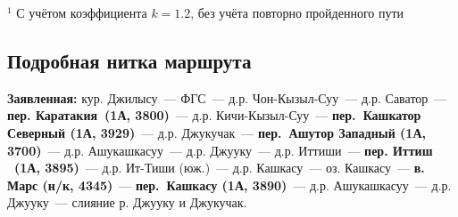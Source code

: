 \begin{table}[h!]
\end{table}
\footnotesize{$^1$ С учётом коэффициента $k=1.2$, без учёта повторно пройденного пути}
\normalsize

\subsection{Подробная нитка маршрута}
\textbf{Заявленная:} кур. Джилысу~--- ФГС~--- д.р. Чон-Кызыл-Суу~--- д.р. Саватор~---  \textbf{пер. Каратакия~(1А, 3800)}~--- д.р. Кичи-Кызыл-Суу~---  \textbf{пер.~Кашкатор Северный (1А, 3929)}~--- д.р. Джукучак~--- \textbf{пер.~Ашутор Западный (1А, 3700)}~--- д.р. Ашукашкасуу~---  д.р. Джууку~---  д.р. Иттиши~---  \textbf{пер. Иттиш ~(1А, 3895)}~---  д.р. Ит-Тиши (юж.)~---   д.р. Кашкасу~---   оз. Кашкасу~---  \textbf{в. Марс (н/к, 4345)}~---  \textbf{пер.~Кашкасу  (1А, 3890)}~--- д.р. Ашукашкасуу~--- д.р. Джууку~--- слияние р. Джууку и Джукучак.

